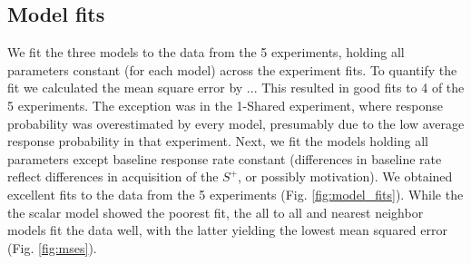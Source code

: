 \subsection*{Model fits}
We fit the three models to the data from the 5 experiments, holding all parameters constant (for each model) across the experiment fits.  
To quantify the fit we calculated the mean square error by ...
This resulted in good fits to 4 of the 5 experiments. 
The exception was in the 1-Shared experiment, where response probability was overestimated by every model, presumably due to the low average response probability in that experiment.  
Next, we fit the models holding all parameters except baseline response rate constant (differences in baseline rate reflect differences in acquisition of the $S^+$, or possibly motivation). 
We obtained excellent fits to the data from the 5 experiments (Fig. \ref{fig:model_fits}).  
While the the scalar model showed the poorest fit, the all to all and nearest neighbor models fit the data well, with the latter yielding the lowest mean squared error (Fig. \ref{fig:mses}).  